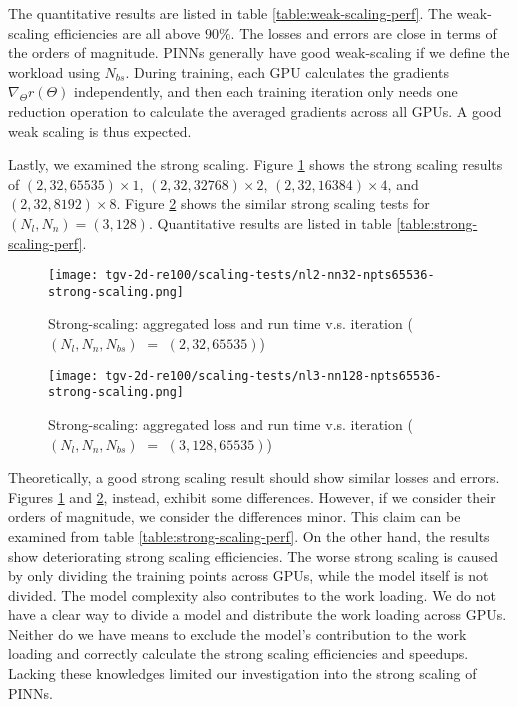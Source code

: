 

The quantitative results are listed in table \ref{table:weak-scaling-perf}.
The weak-scaling efficiencies are all above $90\%$.
The losses and errors are close in terms of the orders of magnitude.
PINNs generally have good weak-scaling if we define the workload using $N_{bs}$.
During training, each GPU calculates the gradients $\nabla_{\Theta} r(\Theta)$ independently, and then each training iteration only needs one reduction operation to calculate the averaged gradients across all GPUs.
A good weak scaling is thus expected.

Lastly, we examined the strong scaling.
Figure \ref{fig:nl2-nn32-npts65536-strong-scaling} shows the strong scaling results of $(2, 32, 65535)\times 1$, $(2, 32, 32768)\times 2$, $(2, 32, 16384)\times 4$, and $(2, 32, 8192)\times 8$.
Figure \ref{fig:nl3-nn128-npts65536-strong-scaling} shows the similar strong scaling tests for $(N_l, N_n)=(3, 128)$.
Quantitative results are listed in table \ref{table:strong-scaling-perf}. 

\begin{figure}[hbt!]
    \centering%
    \texttt{[image: tgv-2d-re100/scaling-tests/nl2-nn32-npts65536-strong-scaling.png]}
    \caption[%
        Strong-scaling: aggregated loss and run time v.s. iteration ($(N_l, N_n, N_{bs})$ $=$ $(2, 32, 65535)$)%
    ]{%
        Strong-scaling: aggregated loss and run time v.s. iteration ($(N_l, N_n, N_{bs})$ $=$ $(2, 32, 65535)$)%
    }\label{fig:nl2-nn32-npts65536-strong-scaling}
\end{figure}

\begin{figure}[hbt!]
    \centering%
    \texttt{[image: tgv-2d-re100/scaling-tests/nl3-nn128-npts65536-strong-scaling.png]}
    \caption[%
        Strong-scaling: aggregated loss and run time v.s. iteration ($(N_l, N_n, N_{bs})$ $=$ $(3, 128, 65535)$)%
    ]{%
        Strong-scaling: aggregated loss and run time v.s. iteration ($(N_l, N_n, N_{bs})$ $=$ $(3, 128, 65535)$)%
    }\label{fig:nl3-nn128-npts65536-strong-scaling}
\end{figure}

Theoretically, a good strong scaling result should show similar losses and errors.
Figures \ref{fig:nl2-nn32-npts65536-strong-scaling} and \ref{fig:nl3-nn128-npts65536-strong-scaling}, instead, exhibit some differences.
However, if we consider their orders of magnitude, we consider the differences minor.
This claim can be examined from table \ref{table:strong-scaling-perf}.
On the other hand, the results show deteriorating strong scaling efficiencies.
The worse strong scaling is caused by only dividing the training points across GPUs, while the model itself is not divided.  
The model complexity also contributes to the work loading.
We do not have a clear way to divide a model and distribute the work loading across GPUs.
Neither do we have means to exclude the model's contribution to the work loading and correctly calculate the strong scaling efficiencies and speedups.
Lacking these knowledges limited our investigation into the strong scaling of PINNs.


